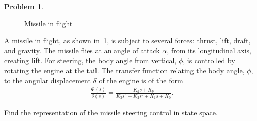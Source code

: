 \documentclass[10pt]{article}
\theoremstyle{definition}
\newtheorem{prob}{Problem}[section]
\begin{document}
\begin{prob}
    \begin{figure}[h]
        \centering
        \begin{scaletikzpicturetowidth}{1\textwidth}
    \end{scaletikzpicturetowidth}
    \caption{Missile in flight~\label{fig:missile}}
    \end{figure}
    A missile in flight, as shown in~\cref{fig:missile}, is subject to several forces: thrust, lift, draft, and gravity.
    The missile flies at an angle of attack \( \alpha \), from its longitudinal axis, creating lift. 
    For steering, the body angle from vertical, \( \phi \), is controlled by rotating the engine at the tail. 
    The transfer function relating the body angle, \( \phi \), to the angular displacement \( \delta \) of the engine is of the form
    \begin{align*}
        \frac{\Phi(s)}{\delta(s)} = \frac{K_a s + K_b}{K_3 s^3 + K_2 s^2 + K_1 s + K_0}.  
    \end{align*}

    \noindent Find the representation of the missile steering control in state space.
\end{prob}
\end{document}
